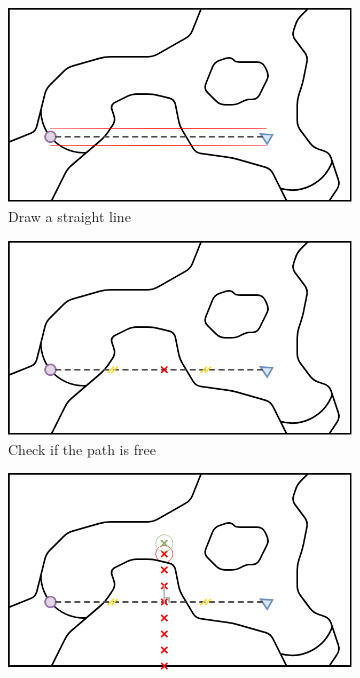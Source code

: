 \documentclass[../main.tex]{subfiles}
\begin{document}
\begin{figure}[H]
	\centering
	\begin{subfigure}[b]{0.45\textwidth}
		\centering
		\includegraphics[width=\textwidth]{IMAGES/part3/methode1.png}
		\caption{Draw a straight line}
		\label{fig:draw_line}
	\end{subfigure}
	\hfill
	\begin{subfigure}[b]{0.45\textwidth}
		\centering
		\includegraphics[width=\textwidth]{IMAGES/part3/methode2.png}
		\caption{Check if the path is free}
		\label{fig:check_line}
	\end{subfigure}
	\vfill
	\begin{subfigure}[b]{0.45\textwidth}
		\centering
		\includegraphics[width=\textwidth]{IMAGES/part3/methode3.png}

\end{subfigure}
\end{figure}
\end{document}
